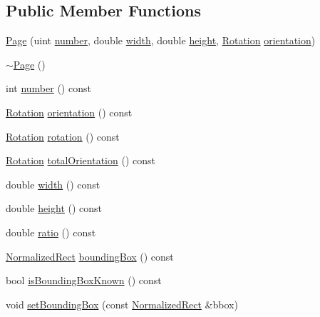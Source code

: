 \subsection*{Public Member Functions}
\begin{DoxyCompactItemize}
\item 
\hyperlink{classOkular_1_1Page_aaba5892652f77f58826306163e6dd8a1}{Page} (uint \hyperlink{classOkular_1_1Page_a6eee5f157a130b47d81ddd63e501664b}{number}, double \hyperlink{classOkular_1_1Page_a57114e88281da2a51b1bb0d5d4996d53}{width}, double \hyperlink{classOkular_1_1Page_a67246a32b3e625946eb5c685b8372a4f}{height}, \hyperlink{namespaceOkular_a8556d00465f61ef533c6b027669e7da6}{Rotation} \hyperlink{classOkular_1_1Page_ab99c3e1660eb4a87afdb093ae0daf06c}{orientation})
\item 
\hyperlink{classOkular_1_1Page_a2341fff1cc032ab6528874175e7dd841}{$\sim$\+Page} ()
\item 
int \hyperlink{classOkular_1_1Page_a6eee5f157a130b47d81ddd63e501664b}{number} () const 
\item 
\hyperlink{namespaceOkular_a8556d00465f61ef533c6b027669e7da6}{Rotation} \hyperlink{classOkular_1_1Page_ab99c3e1660eb4a87afdb093ae0daf06c}{orientation} () const 
\item 
\hyperlink{namespaceOkular_a8556d00465f61ef533c6b027669e7da6}{Rotation} \hyperlink{classOkular_1_1Page_a731947e32744bdcda791d22a2dc88726}{rotation} () const 
\item 
\hyperlink{namespaceOkular_a8556d00465f61ef533c6b027669e7da6}{Rotation} \hyperlink{classOkular_1_1Page_a8cde1b9063d412fc338700026735fe4c}{total\+Orientation} () const 
\item 
double \hyperlink{classOkular_1_1Page_a57114e88281da2a51b1bb0d5d4996d53}{width} () const 
\item 
double \hyperlink{classOkular_1_1Page_a67246a32b3e625946eb5c685b8372a4f}{height} () const 
\item 
double \hyperlink{classOkular_1_1Page_a2d7e8570510ab4cea44eed8a37caf671}{ratio} () const 
\item 
\hyperlink{classOkular_1_1NormalizedRect}{Normalized\+Rect} \hyperlink{classOkular_1_1Page_abaa4dd95f6281d3a7773cf1e3a5ae39a}{bounding\+Box} () const 
\item 
bool \hyperlink{classOkular_1_1Page_a19690d5696075b6e93a5a6ea578ca09e}{is\+Bounding\+Box\+Known} () const 
\item 
void \hyperlink{classOkular_1_1Page_aba284480da607c079dc105f38ffe91ed}{set\+Bounding\+Box} (const \hyperlink{classOkular_1_1NormalizedRect}{Normalized\+Rect} \&bbox)

\end{DoxyCompactItemize}

